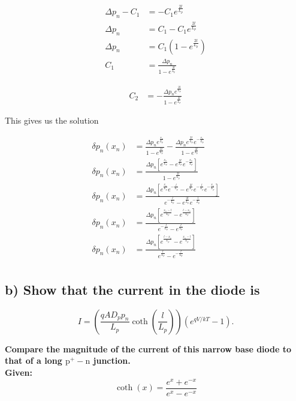 \begin{align*}
    \Delta p_n-C_1&=-C_1e^{\frac{2l}{L_p}}\\
    \Delta p_n&=C_1-C_1e^{\frac{2l}{L_p}}\\
    \Delta p_n&=C_1\left(1-e^{\frac{2l}{L_p}}\right)\\
    C_1&=\frac{\Delta p_n}{1-e^{\frac{2l}{L_p}}}
\end{align*}

\begin{align*}
    C_2&=-\frac{\Delta p_n e^{\frac{2l}{L_p}}}{1-e^{\frac{2l}{L_p}}} 
\end{align*}

This gives us the solution

\begin{align*}
    \delta p_n(x_n)&=\frac{\Delta p_ne^{\frac{x_n}{L_p}}}{1-e^{\frac{2l}{L_p}}}-\frac{\Delta p_n e^{\frac{2l}{L_p}}e^{-\frac{x_n}{L_p}}}{1-e^{\frac{2l}{L_p}}}\\
    \delta p_n(x_n)&=\frac{\Delta p_n \left[e^{\frac{x_n}{L_p}}-e^{\frac{2l}{L_p}}e^{-\frac{x_n}{L_p}}\right] }{1-e^{\frac{2l}{L_p}}}\\
    \delta p_n(x_n)&=\frac{\Delta p_n \left[e^{\frac{x_n}{L_p}}e^{-\frac{l}{L_p}}-e^{\frac{2l}{L_p}}e^{-\frac{l}{L_p}}e^{-\frac{x_n}{L_p}}\right] }{e^{-\frac{l}{L_p}}-e^{\frac{2l}{L_p}}e^{-\frac{l}{L_p}}}\\
    \delta p_n(x_n)&=\frac{\Delta p_n \left[e^{\frac{x_n-l}{L_p}}-e^{\frac{l-x_n}{L_p}}\right] }{e^{-\frac{l}{L_p}}-e^{\frac{l}{L_p}}}\\
    \delta p_n(x_n)&=\frac{\Delta p_n \left[e^{\frac{l-x_n}{L_p}}-e^{\frac{x_n-l}{L_p}}\right] }{e^{\frac{l}{L_p}}-e^{-\frac{l}{L_p}}}\\
\end{align*}



\subsection*{b) Show that the current in the diode is}
$$
I=\left(\frac{q A D_p p_n}{L_p} \operatorname{coth}\left(\frac{l}{L_p}\right)\right)\left(e^{q V / k T}-1\right) .
$$

\textbf{Compare the magnitude of the current of this narrow base diode to that of a long $\mathrm{p}^{+}-\mathrm{n}$ junction. \\Given:}
$$
\operatorname{coth}(x)=\frac{e^x+e^{-x}}{e^x-e^{-x}}
$$

